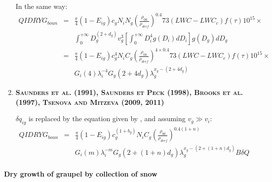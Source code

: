 \begin{enumerate}
In the same way:
\begin{eqnarray}
  QIDRYG_{boun} &=& \frac{\pi}{4} (1 - E_{ig}) c_g N_i N_g
                    \left( \frac{\rho _{00}}{\rho _{dref}} \right)^{0.4}
                    73 (LWC - LWC_c) f(\tau) 10^{15} \times \nonumber \\
                & & \int_0 ^{+ \infty} D_g ^{(2 + d_g)} v_g ^{3} \left[
                      \int_0 ^{+ \infty} D_i ^4 g(D_i) dD_i \right]
                    g(D_g) dD_g \nonumber \\
                &=& \frac{\pi}{4} (1 - E_{ig}) c_g ^4  N_i C_g
                    \left( \frac{\rho _{00}}{\rho _{dref}} \right)^{4 \times 0.4}
                    73 (LWC - LWC_c) f(\tau) 10^{15} \times \nonumber \\
                & & G_i (4) \lambda _i ^{-4}
                    G_g (2 + 4d_g) \lambda _g ^{x_g - (2 + 4d_g)}
\end{eqnarray}


  \item{\bf \textsc{Saunders et al. (1991), Saunders et Peck (1998), Brooks et al. (1997), Tsenova and Mitzeva (2009, 2011)}}

$\delta q_{ig}$ is replaced by the equation given by \citet{Saunders-1991}, and assuming $v_g \gg v_i$:
\begin{eqnarray}
  QIDRYG_{boun} &=& \frac{\pi}{4} (1 - E_{ig}) c_g ^{(1 + b_g)} N_i C_g
                    \left( \frac{\rho _{00}}{\rho _{dref}} \right)^{0.4(1+n)} \nonumber \\
                & & G_i(m) \lambda _i ^{-m}
                    G_g(2 + (1 + n)d_g) \lambda _g ^{x_g-(2+(1+n)d_g)}
                    B \delta Q
\end{eqnarray}

\end{enumerate}


\paragraph{Dry growth of graupel by collection of snow}


